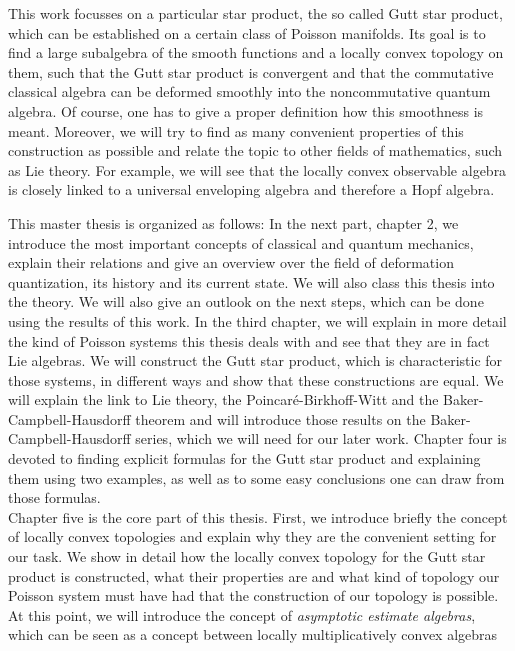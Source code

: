 This work focusses on a particular star product, the so called Gutt star 
product, which can be established on a certain class of Poisson manifolds. Its 
goal is to find a large subalgebra of the smooth functions and a locally 
convex topology on them, such that the Gutt star product is convergent and that 
the commutative classical algebra can be deformed smoothly into the 
noncommutative quantum algebra. Of course, one has to give a proper definition 
how this smoothness is meant. Moreover, we will try to find as many convenient 
properties of this construction as possible and relate the topic to other 
fields of mathematics, such as Lie theory. For example, we will see that the 
locally convex observable algebra is closely linked to a universal enveloping 
algebra and therefore a Hopf algebra.


This master thesis is organized as follows: In the next part, chapter 2, we 
introduce the most important concepts of classical and quantum mechanics, 
explain their relations and give an overview over the field of deformation 
quantization, its history and its current state. We will also class this thesis 
into the theory. We will also give an outlook on the next steps, which can be 
done using the results of this work.
In the third chapter, we will explain in more detail the kind of Poisson 
systems this thesis deals with and see that they are in fact Lie algebras. We 
will construct the Gutt star product, which is characteristic for those 
systems, in different ways and show that these constructions are equal. We will 
explain the link to Lie theory, the Poincar\'e-Birkhoff-Witt and the 
Baker-Campbell-Hausdorff theorem and will introduce those results on the 
Baker-Campbell-Hausdorff series, which we will need for our later work.
Chapter four is devoted to finding explicit formulas for the Gutt star product 
and explaining them using two examples, as well as to some easy conclusions one 
can draw from those formulas.\\
Chapter five is the core part of this thesis. First, we introduce briefly the 
concept of locally convex topologies and explain why they are the convenient 
setting for our task. We show in detail how the locally convex topology for the 
Gutt star product is constructed, what their properties are and what kind of 
topology our Poisson system must have had that the construction of our 
topology is possible. At this point, we will introduce the concept of 
\emph{asymptotic estimate algebras}, 
which can be seen as a concept between locally multiplicatively convex algebras 
